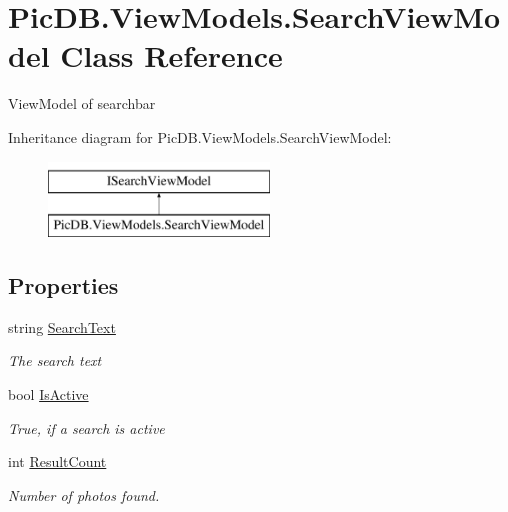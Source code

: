 \hypertarget{class_pic_d_b_1_1_view_models_1_1_search_view_model}{}\section{Pic\+D\+B.\+View\+Models.\+Search\+View\+Model Class Reference}
\label{class_pic_d_b_1_1_view_models_1_1_search_view_model}


View\+Model of searchbar  


Inheritance diagram for Pic\+D\+B.\+View\+Models.\+Search\+View\+Model\+:\begin{figure}[H]
\begin{center}
\leavevmode
\includegraphics[height=2.000000cm]{class_pic_d_b_1_1_view_models_1_1_search_view_model}
\end{center}
\end{figure}
\subsection*{Properties}
\begin{DoxyCompactItemize}
\item 
string \mbox{\hyperlink{class_pic_d_b_1_1_view_models_1_1_search_view_model_aeba05756675efaf7ce63d22d19215231}{Search\+Text}}
\begin{DoxyCompactList}\small\item\em The search text \end{DoxyCompactList}\item 
bool \mbox{\hyperlink{class_pic_d_b_1_1_view_models_1_1_search_view_model_ac182a20e1f3d07d041057228d1c265b0}{Is\+Active}}
\begin{DoxyCompactList}\small\item\em True, if a search is active \end{DoxyCompactList}\item 
int \mbox{\hyperlink{class_pic_d_b_1_1_view_models_1_1_search_view_model_ab0b96a30c200f0e7ba85241bcfce82c7}{Result\+Count}}
\begin{DoxyCompactList}\small\item\em Number of photos found. \end{DoxyCompactList}\end{DoxyCompactItemize}


